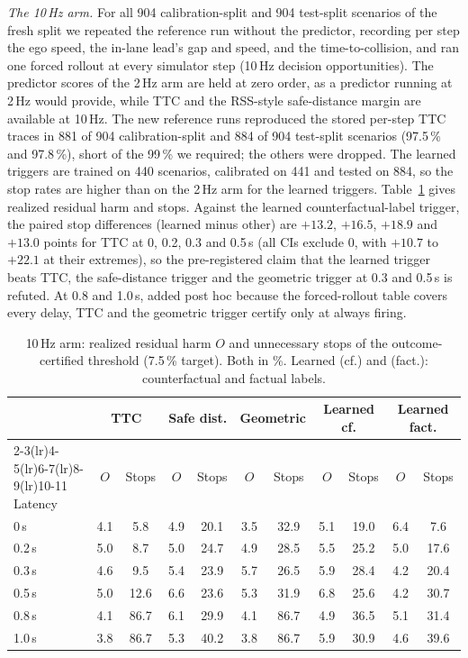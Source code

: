 \documentclass[lettersize,journal]{IEEEtran}
\begin{document}
\emph{The 10\,Hz arm.} For all 904 calibration-split and 904 test-split
scenarios of the fresh split we repeated the reference run without the
predictor, recording per step the ego speed, the in-lane lead's gap and
speed, and the time-to-collision, and ran one forced rollout at every
simulator step (10\,Hz decision opportunities). The predictor scores of the
2\,Hz arm are held at zero order, as a predictor running at 2\,Hz would
provide, while TTC and the RSS-style safe-distance margin are available at
10\,Hz. The new reference runs reproduced the stored per-step TTC traces in
881 of 904 calibration-split and 884 of 904 test-split scenarios (97.5\,\% and
97.8\,\%), short of the 99\,\% we required; the others were dropped. The learned
triggers are trained on 440 scenarios, calibrated on 441 and tested on 884, so
the stop rates are higher than on the 2\,Hz arm for the learned triggers.
Table~\ref{tab:hz10} gives realized residual harm and stops. Against the
learned counterfactual-label trigger, the paired stop differences
(learned minus other) are $+13.2$, $+16.5$, $+18.9$ and $+13.0$ points for TTC
at 0, 0.2, 0.3 and 0.5\,s (all CIs exclude 0, with $+10.7$ to $+22.1$ at their
extremes), so the pre-registered claim that the learned trigger beats TTC,
the safe-distance trigger and the geometric trigger at 0.3 and 0.5\,s is
refuted. At 0.8 and 1.0\,s, added post hoc because the forced-rollout table
covers every delay, TTC and the geometric trigger certify only at always
firing.

\begin{table}[h]
\caption{10\,Hz arm: realized residual harm $O$ and unnecessary stops of the
outcome-certified threshold (7.5\,\% target). Both in \%. Learned (cf.) and (fact.):
counterfactual and factual labels.}
\label{tab:hz10}
\centering
\scriptsize\setlength{\tabcolsep}{2pt}
\begin{tabular}{lcccccccccc}
\toprule
 & \multicolumn{2}{c}{TTC} & \multicolumn{2}{c}{Safe dist.} & \multicolumn{2}{c}{Geometric} & \multicolumn{2}{c}{Learned cf.} & \multicolumn{2}{c}{Learned fact.} \\
\cmidrule(lr){2-3}\cmidrule(lr){4-5}\cmidrule(lr){6-7}\cmidrule(lr){8-9}\cmidrule(lr){10-11}
Latency & $O$ & Stops & $O$ & Stops & $O$ & Stops & $O$ & Stops & $O$ & Stops \\
\midrule
0\,s & 4.1 & 5.8 & 4.9 & 20.1 & 3.5 & 32.9 & 5.1 & 19.0 & 6.4 & 7.6 \\
0.2\,s & 5.0 & 8.7 & 5.0 & 24.7 & 4.9 & 28.5 & 5.5 & 25.2 & 5.0 & 17.6 \\
0.3\,s & 4.6 & 9.5 & 5.4 & 23.9 & 5.7 & 26.5 & 5.9 & 28.4 & 4.2 & 20.4 \\
0.5\,s & 5.0 & 12.6 & 6.6 & 23.6 & 5.3 & 31.9 & 6.8 & 25.6 & 4.2 & 30.7 \\
0.8\,s & 4.1 & 86.7 & 6.1 & 29.9 & 4.1 & 86.7 & 4.9 & 36.5 & 5.1 & 31.4 \\
1.0\,s & 3.8 & 86.7 & 5.3 & 40.2 & 3.8 & 86.7 & 5.9 & 30.9 & 4.6 & 39.6 \\
\bottomrule
\end{tabular}
\end{table}
\end{document}
